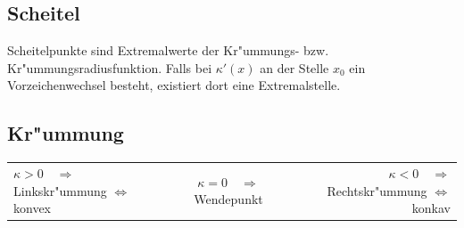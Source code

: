 	\subsection{Scheitel } %
		Scheitelpunkte sind Extremalwerte der Kr"ummungs- bzw. Kr"ummungsradiusfunktion.
		Falls bei $\kappa'(x)$ an der Stelle $x_0$ ein Vorzeichenwechsel besteht, existiert dort
		eine Extremalstelle. 
	
	\subsection{Kr"ummung } %
		\begin{tabular}{l|c|r}
			$\kappa > 0 \quad\Rightarrow$ \quad Linkskr"ummung $\iff$ konvex &
			$\kappa = 0 \quad\Rightarrow$ \quad Wendepunkt \quad & \quad
			$\kappa < 0 \quad\Rightarrow$ \quad Rechtskr"ummung $\iff$ konkav
			\\ 
		\end{tabular}
